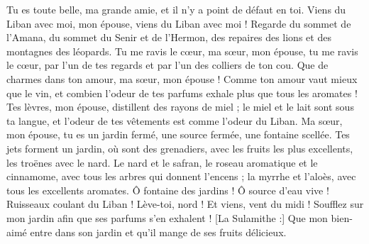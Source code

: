 \begin{multicols}{2}
Tu es toute belle, ma grande amie, et il n'y a point de défaut en toi.
Viens du Liban avec moi, mon épouse, viens du Liban avec moi ! Regarde du sommet de l'Amana, du sommet du Senir et de l’Hermon, des repaires des lions et des montagnes des léopards.
Tu me ravis le cœur, ma sœur, mon épouse, tu me ravis le cœur, par l'un de tes regards et par l'un des colliers de ton cou.
Que de charmes dans ton amour, ma sœur, mon épouse ! Comme ton amour vaut mieux que le vin, et combien l'odeur de tes parfums exhale plus que tous les aromates !
Tes lèvres, mon épouse, distillent des rayons de miel ; le miel et le lait sont sous ta langue, et l'odeur de tes vêtements est comme l'odeur du Liban.
Ma sœur, mon épouse, tu es un jardin fermé, une source fermée, une fontaine scellée.
Tes jets forment un jardin, où sont des grenadiers, avec les fruits les plus excellents, les troënes avec le nard.
Le nard et le safran, le roseau aromatique et le cinnamome, avec tous les arbres qui donnent l'encens ; la myrrhe et l'aloès, avec tous les excellents aromates.
Ô fontaine des jardins ! Ô source d'eau vive ! Ruisseaux coulant du Liban !
Lève-toi, nord ! Et viens, vent du midi ! Soufflez sur mon jardin afin que ses parfums s’en exhalent ! [La Sulamithe :] Que mon bien-aimé entre dans son jardin et qu'il mange de ses fruits délicieux.

\end{multicols}
